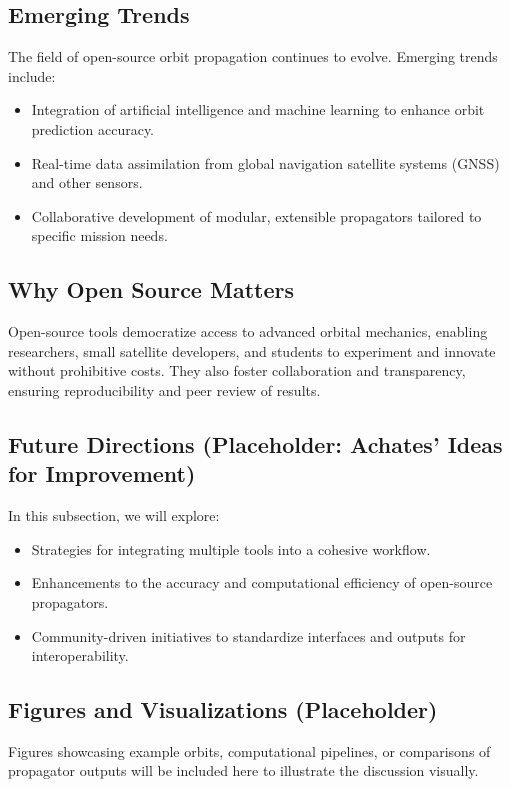 \subsection{Emerging Trends}
The field of open-source orbit propagation continues to evolve. Emerging trends include:
\begin{itemize}
    \item Integration of artificial intelligence and machine learning to enhance orbit prediction accuracy.
    \item Real-time data assimilation from global navigation satellite systems (GNSS) and other sensors.
    \item Collaborative development of modular, extensible propagators tailored to specific mission needs.
\end{itemize}

\subsection{Why Open Source Matters}
Open-source tools democratize access to advanced orbital mechanics, enabling researchers, small satellite developers, and students to experiment and innovate without prohibitive costs. They also foster collaboration and transparency, ensuring reproducibility and peer review of results.

\subsection{Future Directions (Placeholder: Achates' Ideas for Improvement)}
In this subsection, we will explore:
\begin{itemize}
    \item Strategies for integrating multiple tools into a cohesive workflow.
    \item Enhancements to the accuracy and computational efficiency of open-source propagators.
    \item Community-driven initiatives to standardize interfaces and outputs for interoperability.
\end{itemize}

\subsection{Figures and Visualizations (Placeholder)}
Figures showcasing example orbits, computational pipelines, or comparisons of propagator outputs will be included here to illustrate the discussion visually.

